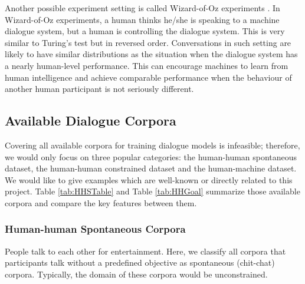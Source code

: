 \documentclass[bsc,frontabs,twoside,singlespacing,parskip,deptreport]{infthesis}     %
\begin{document}
Another possible experiment setting is called Wizard-of-Oz experiments \cite{bohus2008sorry,petrik2004wizard,budzianowski2018multiwoz,eric2019multiwoz}. In Wizard-of-Oz experiments, a human thinks he/she is speaking to a machine dialogue system, but a human is controlling the dialogue system. This is very similar to Turing's test but in reversed order. Conversations in such setting are likely to have similar distributions as the situation when the dialogue system has a nearly human-level performance. This can encourage machines to learn from human intelligence and achieve comparable performance when the behaviour of another human participant is not seriously different.  

\subsection{Available Dialogue Corpora}

Covering all available corpora for training dialogue models is infeasible; therefore, we would only focus on three popular categories: the human-human spontaneous dataset, the human-human constrained dataset and the human-machine dataset. We would like to give examples which are well-known or directly related to this project. Table \ref{tab:HHSTable} and Table \ref{tab:HHGoal} summarize those available corpora and compare the key features between them.

\subsubsection*{Human-human Spontaneous Corpora}

People talk to each other for entertainment. Here, we classify all corpora that participants talk without a predefined objective as spontaneous (chit-chat) corpora. Typically, the domain of these corpora would be unconstrained.
\end{document}
